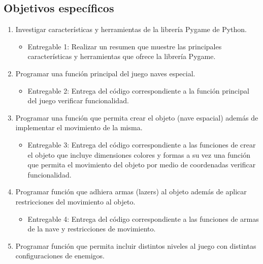 \documentclass[12pt,letterpaper]{article}
\begin{document}
\subsection{Objetivos específicos} 
\begin{enumerate}
    \item  Investigar características y herramientas de la librería Pygame de Python.
        \begin{itemize}
            \item Entregable 1: Realizar un resumen que muestre las principales características y herramientas que ofrece la librería Pygame. 
            
        \end{itemize}

    \item  Programar una función principal del juego naves especial. 
        \begin{itemize}
            \item Entregable 2: Entrega del código correspondiente a la función principal del juego verificar funcionalidad. 
            
        \end{itemize}
   
    \item  Programar una función que permita crear el objeto (nave espacial) además de implementar el movimiento de la misma.  
        \begin{itemize}
            \item Entregable 3: Entrega del código correspondiente a  las funciones de crear el objeto que incluye dimensiones colores y formas a su vez una función que permita el movimiento del objeto por medio de coordenadas verificar funcionalidad. 
            
        \end{itemize}
        
    \item  Programar función que adhiera armas (lazers) al objeto además de aplicar restricciones del movimiento al objeto.
    
 
        \begin{itemize}
            \item Entregable 4: Entrega del código correspondiente a  las funciones de armas de la nave y restricciones de movimiento.

            
        \end{itemize}
        
    \item  Programar función que permita incluir distintos niveles al juego con distintas configuraciones de enemigos.  
    

\end{enumerate}
\end{document}
